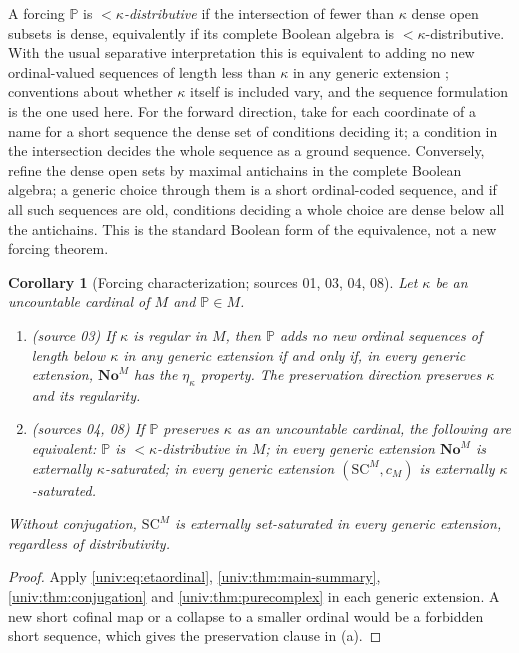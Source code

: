 \documentclass[11pt,letterpaper]{article}
\numberwithin{equation}{section}
\newtheorem{corollary}[corollary]{Corollary}
\theoremstyle{definition}
\theoremstyle{remark}
\newcommand{\No}{\mathbf{No}}
\newcommand{\SC}{\mathrm{SC}}
\newcommand{\NoM}{\No^{M}}
\newcommand{\SCM}{\SC^{M}}
\begin{document}
A forcing $\mathbb P$ is \emph{$<\kappa$-distributive} if the intersection of
fewer than $\kappa$ dense open subsets is dense, equivalently if its complete
Boolean algebra is $<\kappa$-distributive. With the usual separative
interpretation this is equivalent to adding no new ordinal-valued sequences of
length less than $\kappa$ in any generic extension \cite{Jech}; conventions
about whether $\kappa$ itself is included vary, and the sequence formulation is
the one used here. For the forward direction, take for each coordinate of a
name for a short sequence the dense set of conditions deciding it; a condition
in the intersection decides the whole sequence as a ground sequence.
Conversely, refine the dense open sets by maximal antichains in the complete
Boolean algebra; a generic choice through them is a short ordinal-coded
sequence, and if all such sequences are old, conditions deciding a whole
choice are dense below all the antichains. This is the standard Boolean form of
the equivalence, not a new forcing theorem.

\begin{corollary}[Forcing characterization; sources 01, 03, 04, 08]\label{univ:cor:distributivity}
Let $\kappa$ be an uncountable cardinal of $M$ and $\mathbb P\in M$.
\begin{enumerate}[label=\textnormal{(\alph*)}]
\item \textup{(source 03)} If $\kappa$ is regular in $M$, then $\mathbb P$ adds
no new ordinal sequences of length below $\kappa$ in any generic extension if
and only if, in every generic extension, $\NoM$ has the $\eta_\kappa$
property. The preservation direction preserves $\kappa$ and its regularity.
\item \textup{(sources 04, 08)} If $\mathbb P$ preserves $\kappa$ as an
uncountable cardinal, the following are equivalent: $\mathbb P$ is
$<\kappa$-distributive in $M$; in every generic extension $\NoM$ is externally
$\kappa$-saturated; in every generic extension $(\SCM,c_M)$ is externally
$\kappa$-saturated.
\end{enumerate}
Without conjugation, $\SCM$ is externally set-saturated in every generic
extension, regardless of distributivity.
\end{corollary}
\begin{proof}
Apply \eqref{univ:eq:etaordinal}, \cref{univ:thm:main-summary},
\cref{univ:thm:conjugation} and \cref{univ:thm:purecomplex} in each generic
extension. A new short cofinal map or a collapse to a smaller ordinal would be
a forbidden short sequence, which gives the preservation clause in (a).
\end{proof}
\end{document}
